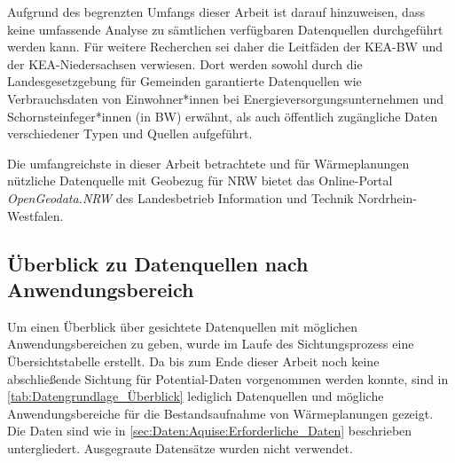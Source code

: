 			Aufgrund des begrenzten Umfangs dieser Arbeit ist darauf hinzuweisen, dass keine umfassende Analyse zu sämtlichen verfügbaren Datenquellen durchgeführt werden kann. Für weitere Recherchen sei daher die Leitfäden der KEA-BW und der KEA-Niedersachsen verwiesen. Dort werden sowohl durch die Landesgesetzgebung für Gemeinden garantierte Datenquellen wie Verbrauchsdaten von Einwohner*innen bei Energieversorgungsunternehmen und Schornsteinfeger*innen (in BW) erwähnt, als auch öffentlich zugängliche Daten verschiedener Typen und Quellen aufgeführt. \cite{kea_bw_leitfaden_waermeplanung} \cite{web_leitfaden_waermeplanung_datenquellen_niedersachsen}
			
			Die umfangreichste in dieser Arbeit betrachtete und für Wärmeplanungen nützliche Datenquelle mit Geobezug für NRW bietet das Online-Portal \textit{OpenGeodata.NRW} des Landesbetrieb Information und Technik Nordrhein-Westfalen.\\
		
		\subsection{Überblick zu Datenquellen nach Anwendungsbereich}
		\label{sec:Daten:Aquise:Überblick}
			Um einen Überblick über gesichtete Datenquellen mit möglichen Anwendungsbereichen zu geben, wurde im Laufe des Sichtungsprozess eine Übersichtstabelle erstellt. Da bis zum Ende dieser Arbeit noch keine abschließende Sichtung für Potential-Daten vorgenommen werden konnte, sind in \autoref{tab:Datengrundlage_Überblick} lediglich Datenquellen und mögliche Anwendungsbereiche für die Bestandsaufnahme von Wärmeplanungen gezeigt. Die Daten sind wie in \autoref{sec:Daten:Aquise:Erforderliche_Daten} beschrieben untergliedert. Ausgegraute Datensätze wurden nicht verwendet. 
			
			
						
			
